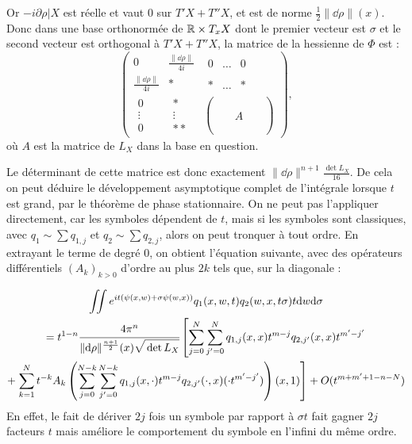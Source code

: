 Or $-i\partial \rho|X$ est réelle et vaut $0$ sur $T'X+T''X$, et est de norme $\frac 12 \|\dd\rho\|(x)$. Donc dans une base orthonormée de $\mathbb{R}\times T_xX$ dont le premier vecteur est $\sigma$ et le second vecteur est orthogonal à $T'X+T''X$, la matrice de la hessienne de $\Phi$ est :
\begin{equation*}
\begin{pmatrix}
  0 & \frac{\|\dd\rho\|}{4i} &\begin{matrix}0&\ldots & 0\end{matrix}\\
  \frac{\|\dd\rho\|}{4i} & * & \begin{matrix}*&\ldots & *\end{matrix}\\
  \begin{matrix}0\\\vdots\\0\end{matrix}& \begin{matrix}*\\\vdots\\** \end{matrix}&\begin{pmatrix}\phantom{A}&\phantom{A}&\phantom{A}\\\phantom{A}&A&\phantom{A}\\\phantom{A}&\phantom{A}&\phantom{A}\end{pmatrix}
\end{pmatrix},
\end{equation*}
où $A$ est la matrice de $L_X$ dans la base en question. 

Le déterminant de cette matrice est donc exactement $\|\dd\rho\|^{n+1}\frac{\det L_X}{16}$. De cela on peut déduire le développement asymptotique complet de l'intégrale lorsque $t$ est grand, par le théorème de phase stationnaire. On ne peut pas l'appliquer directement, car les symboles dépendent de $t$, mais si les symboles sont classiques, avec $q_1 \sim \sum q_{1,j}$ et $q_2 \sim  \sum q_{2,j}$, alors on peut tronquer à tout ordre. En extrayant le terme de degré $0$, on obtient l'équation suivante, avec des opérateurs différentiels $(A_k)_{k >0}$ d'ordre au plus $2k$ tels que, sur la diagonale :

\begin{multline*}
  \iint e^{it(\psi(x,w)+\sigma
    \psi(w,x))}q_1(x,w,t)q_2(w,x,t\sigma)t\dd w\dd\sigma \\= t^{1-n}\cfrac{4\pi^n}{\|\dd\rho\|^{\frac{n+1}{2}}(x)\sqrt{\vphantom{\hat{A}}\det L_X}}\left[\sum_{j=0}^{N}\sum_{j'=0}^{N} q_{1,j}(x,x)t^{m-j}q_{2,j'}(x,x)t^{m'-j'}\right. \\+ \left.\sum_{k=1}^{N}t^{-k}A_k\left(\sum_{j=0}^{N-k}\sum_{j'=0}^{N-k} q_{1,j}(x,\cdot)t^{m-j}q_{2,j'}(\cdot,x)(\cdot t^{m'-j'})\right)(x,1)\right] + O(t^{m+m'+1-n-N})
\end{multline*}
En effet, le fait de dériver $2j$ fois un symbole par rapport à $\sigma t$ fait gagner $2j$ facteurs $t$ mais améliore le comportement du symbole en l'infini du même ordre.

